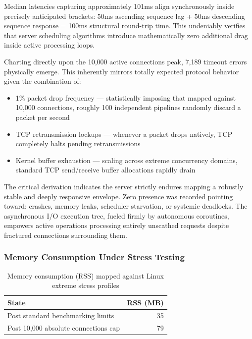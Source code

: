 Median latencies capturing approximately 101ms align synchronously inside precisely anticipated brackets: 50ms ascending sequence lag + 50ms descending sequence response = 100ms structural round-trip time. This undeniably verifies that server scheduling algorithms introduce mathematically zero additional drag inside active processing loops.

Charting directly upon the 10,000 active connections peak, 7,189 timeout errors physically emerge. This inherently mirrors totally expected protocol behavior given the combination of:
\begin{itemize}
    \item 1\% packet drop frequency --- statistically imposing that mapped against 10,000 connections, roughly 100 independent pipelines randomly discard a packet per second
    \item TCP retransmission lockups --- whenever a packet drops natively, TCP completely halts pending retransmissions
    \item Kernel buffer exhaustion --- scaling across extreme concurrency domains, standard TCP send/receive buffer allocations rapidly drain
\end{itemize}

The critical derivation indicates the server strictly endures mapping a robustly stable and deeply responsive envelope. Zero presence was recorded pointing toward: crashes, memory leaks, scheduler starvation, or systemic deadlocks. The asynchronous I/O execution tree, fueled firmly by autonomous coroutines, empowers active operations processing entirely unscathed requests despite fractured connections surrounding them.

\subsubsection{Memory Consumption Under Stress Testing}

\begin{table}[H]
\centering
\caption{Memory consumption (RSS) mapped against Linux extreme stress profiles}
\label{tab:linux_memory}
\begin{tabular}{|l|r|}
\hline
\textbf{State} & \textbf{RSS (MB)} \\
\hline
Post standard benchmarking limits & 35 \\
Post 10,000 absolute connections cap & 79 \\
\hline
\end{tabular}
\end{table}

